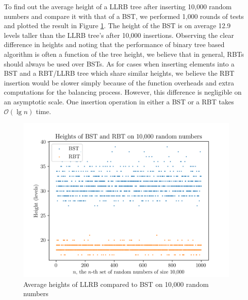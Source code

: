 \documentclass[titlepage, 12pt]{article}
\begin{document}
To find out the average height of a LLRB tree after inserting 10,000 random
numbers and compare it with that of a BST, we performed 1,000 rounds of tests
and plotted the result in Figure \ref{fig:rand}. The height of the BST is on
average 12.9 levels taller than the LLRB tree's after 10,000 insertions.
Observing the clear difference in heights and noting that the performance of
binary tree based algorithm is often a function of the tree height, we believe
that in general, RBTs should always be used over BSTs. As for cases when
inserting elements into a BST and a RBT/LLRB tree which share similar heights,
we believe the RBT insertion would be slower simply because of the function
overheads and extra computations for the balancing process. However, this
difference is negligible on an asymptotic scale. One insertion operation in
either a BST or a RBT takes \(\mathcal{O}(\lg{n})\) time.
\begin{figure}[h]
  \centering
  \includegraphics[width=0.8\linewidth]{rand}
  \caption{Average heights of LLRB compared to BST on 10,000 random numbers}
  \label{fig:rand}
\end{figure}
\end{document}
